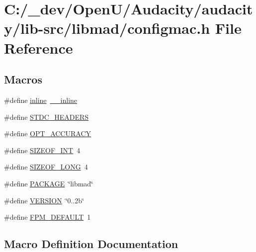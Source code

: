\hypertarget{lib-src_2libmad_2configmac_8h}{}\section{C\+:/\+\_\+dev/\+Open\+U/\+Audacity/audacity/lib-\/src/libmad/configmac.h File Reference}
\label{lib-src_2libmad_2configmac_8h}
\subsection*{Macros}
\begin{DoxyCompactItemize}
\item 
\#define \hyperlink{lib-src_2libmad_2configmac_8h_a00d24c7231be28dbaf71f5408f30e44c}{inline}~\hyperlink{cdefs_8h_a96deb7ba5a74848afb710cc4ee6d2c08}{\+\_\+\+\_\+inline}
\item 
\#define \hyperlink{lib-src_2libmad_2configmac_8h_a550e5c272cc3cf3814651721167dcd23}{S\+T\+D\+C\+\_\+\+H\+E\+A\+D\+E\+RS}
\item 
\#define \hyperlink{lib-src_2libmad_2configmac_8h_a1a983ef557b56cbadafae272d31bb7b4}{O\+P\+T\+\_\+\+A\+C\+C\+U\+R\+A\+CY}
\item 
\#define \hyperlink{lib-src_2libmad_2configmac_8h_a44184cf844a916eee78598ab35fc966b}{S\+I\+Z\+E\+O\+F\+\_\+\+I\+NT}~4
\item 
\#define \hyperlink{lib-src_2libmad_2configmac_8h_a22aece5d034fd9040a3d01c3797fdfe7}{S\+I\+Z\+E\+O\+F\+\_\+\+L\+O\+NG}~4
\item 
\#define \hyperlink{lib-src_2libmad_2configmac_8h_aca8570fb706c81df371b7f9bc454ae03}{P\+A\+C\+K\+A\+GE}~\char`\"{}libmad\char`\"{}
\item 
\#define \hyperlink{lib-src_2libmad_2configmac_8h_a1c6d5de492ac61ad29aec7aa9a436bbf}{V\+E\+R\+S\+I\+ON}~\char`\"{}0..\+2b\char`\"{}
\item 
\#define \hyperlink{lib-src_2libmad_2configmac_8h_a0758b917988ae01ed1ca812c461c7eef}{F\+P\+M\+\_\+\+D\+E\+F\+A\+U\+LT}~1
\end{DoxyCompactItemize}


\subsection{Macro Definition Documentation}
